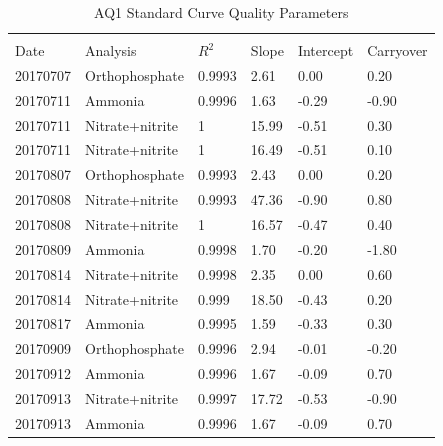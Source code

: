 \begin{table}[]
	\caption{AQ1 Standard Curve Quality Parameters}
	\label{tab:aq1}
	\begin{center}
\begin{tabular}{llllll} 
	\hline \\
Date     & Analysis 		& $R^2$  & Slope & Intercept & Carryover \\ \hline
20170707 & Orthophosphate 	& 0.9993 & 2.61  & 0.00      & 0.20      \\
20170711 & Ammonia  		& 0.9996 & 1.63  & -0.29     & -0.90     \\
20170711 & Nitrate+nitrite 	& 1      & 15.99 & -0.51     & 0.30      \\
20170711 & Nitrate+nitrite 	& 1      & 16.49 & -0.51     & 0.10      \\
20170807 & Orthophosphate 	& 0.9993 & 2.43  & 0.00      & 0.20      \\
20170808 & Nitrate+nitrite 	& 0.9993 & 47.36 & -0.90     & 0.80      \\
20170808 & Nitrate+nitrite	& 1      & 16.57 & -0.47     & 0.40      \\
20170809 & Ammonia   		& 0.9998 & 1.70  & -0.20     & -1.80     \\
20170814 & Nitrate+nitrite 	& 0.9998 & 2.35  & 0.00      & 0.60      \\
20170814 & Nitrate+nitrite 	& 0.999  & 18.50 & -0.43     & 0.20      \\
20170817 & Ammonia  		& 0.9995 & 1.59  & -0.33     & 0.30      \\
20170909 & Orthophosphate 	& 0.9996 & 2.94  & -0.01     & -0.20     \\
20170912 & Ammonia  		& 0.9996 & 1.67  & -0.09     & 0.70      \\
20170913 & Nitrate+nitrite 	& 0.9997 & 17.72 & -0.53     & -0.90     \\
20170913 & Ammonia 		& 0.9996 & 1.67  & -0.09     & 0.70      \\ \hline      
\end{tabular}
\end{center}
\end{table}

